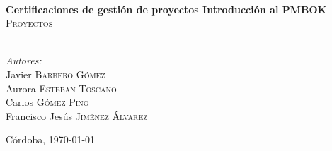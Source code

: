 \begin{titlepage}
  \HRule \\[0.4cm]
  { \huge \bfseries Certificaciones de gestión de proyectos Introducción al PMBOK}\\[0.4cm] %
  \textsc{\large Proyectos}\\[0.5cm]
  \HRule \\[1.5cm]
  
  
      \begin{minipage}{0.6\textwidth}
        \begin{flushleft} \large
          \emph{Autores:}\\
          Javier \textsc{Barbero Gómez} \\
          Aurora \textsc{Esteban Toscano} \\
          Carlos \textsc{Gómez Pino} \\
          Francisco Jesús \textsc{Jiménez Álvarez}
        \end{flushleft}
      \end{minipage}
  


\bigskip
\bigskip
\bigskip
{\large Córdoba, \today}\\[2cm] %





\end{titlepage}
